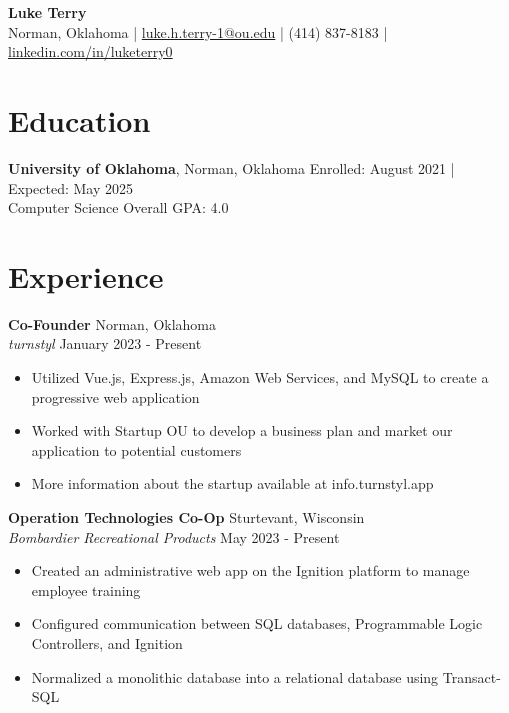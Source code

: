 \documentclass[a4paper,10pt]{extarticle}
\begin{document}
\pagestyle{empty}

\begin{center}
\textbf{\Large Luke Terry}\\[2pt] %
Norman, Oklahoma | \href{mailto:luke.h.terry-1@ou.edu}{luke.h.terry-1@ou.edu} | (414) 837-8183 | \href{https://www.linkedin.com/in/luketerry0/}{linkedin.com/in/luketerry0}
\end{center}

\section*{Education}
\noindent
\textbf{University of Oklahoma}, Norman, Oklahoma \hfill Enrolled: August 2021 | Expected: May 2025\\ %
Computer Science \hfill Overall GPA: 4.0\\ %

\section*{Experience}
\noindent
\textbf{Co-Founder} \hfill Norman, Oklahoma\\ %
\textit{turnstyl} \hfill January 2023 - Present %
\begin{itemize}
    \item Utilized Vue.js, Express.js, Amazon Web Services, and MySQL to create a progressive web application 
    \item Worked with Startup OU to develop a business plan and market our application to potential customers
    \item More information about the startup available at info.turnstyl.app
\end{itemize}

\noindent
\textbf{Operation Technologies Co-Op} \hfill Sturtevant, Wisconsin\\ %
\textit{Bombardier Recreational Products} \hfill May 2023 - Present %
\begin{itemize}
    \item Created an administrative web app on the Ignition platform to manage employee training
    \item Configured communication between SQL databases, Programmable Logic Controllers, and Ignition
    \item Normalized a monolithic database into a relational database using Transact-SQL
\end{itemize}
\end{document}
